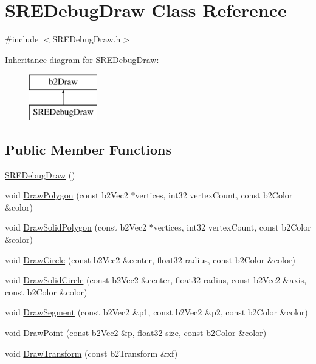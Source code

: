 \hypertarget{class_s_r_e_debug_draw}{}\section{S\+R\+E\+Debug\+Draw Class Reference}
\label{class_s_r_e_debug_draw}


{\ttfamily \#include $<$S\+R\+E\+Debug\+Draw.\+h$>$}

Inheritance diagram for S\+R\+E\+Debug\+Draw\+:\begin{figure}[H]
\begin{center}
\leavevmode
\includegraphics[height=2.000000cm]{class_s_r_e_debug_draw}
\end{center}
\end{figure}
\subsection*{Public Member Functions}
\begin{DoxyCompactItemize}
\item 
\hyperlink{class_s_r_e_debug_draw_a6b4f4f7d72bb85ea3bfecd282786693a}{S\+R\+E\+Debug\+Draw} ()
\item 
void \hyperlink{class_s_r_e_debug_draw_a3aeb14dc08bb5c4d490e30cc62ad1787}{Draw\+Polygon} (const b2\+Vec2 $\ast$vertices, int32 vertex\+Count, const b2\+Color \&color)
\item 
void \hyperlink{class_s_r_e_debug_draw_af8308d695e1c6b61a2ba4226921c6b70}{Draw\+Solid\+Polygon} (const b2\+Vec2 $\ast$vertices, int32 vertex\+Count, const b2\+Color \&color)
\item 
void \hyperlink{class_s_r_e_debug_draw_a6cb71e10d252900e6f469389146b9f48}{Draw\+Circle} (const b2\+Vec2 \&center, float32 radius, const b2\+Color \&color)
\item 
void \hyperlink{class_s_r_e_debug_draw_a9392357bb882d28ca0a86f179901488b}{Draw\+Solid\+Circle} (const b2\+Vec2 \&center, float32 radius, const b2\+Vec2 \&axis, const b2\+Color \&color)
\item 
void \hyperlink{class_s_r_e_debug_draw_ae52016e6134930d09f6f8a07308cc9e7}{Draw\+Segment} (const b2\+Vec2 \&p1, const b2\+Vec2 \&p2, const b2\+Color \&color)
\item 
void \hyperlink{class_s_r_e_debug_draw_aaa826d0f196accca390c47023d28e2ce}{Draw\+Point} (const b2\+Vec2 \&p, float32 size, const b2\+Color \&color)
\item 
void \hyperlink{class_s_r_e_debug_draw_a5255695e40bf3418a9f68e1405822aeb}{Draw\+Transform} (const b2\+Transform \&xf)
\end{DoxyCompactItemize}


